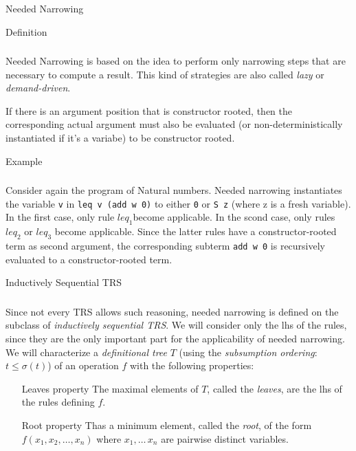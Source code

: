 \documentclass{beamer}
\begin{document}
\begin{section}{Needed Narrowing}
  \begin{subsection}{Definition}
    \begin{frame}
\frametitle{\subsecname}
      Needed Narrowing is based on the idea to perform only narrowing steps that are necessary to compute a result. This kind of strategies are also called \textit{lazy} or \textit{demand-driven}.

      If there is an argument position that is constructor rooted, then the corresponding actual argument must also be evaluated (or non-deterministically instantiated if it's a variabe) to be constructor rooted.
    \end{frame}
  \end{subsection}
\begin{subsection}{Example}

\begin{frame}[fragile]
\frametitle{\subsecname}
Consider again the program of Natural numbers. Needed narrowing instantiates the variable \verb|v| in \verb|leq v (add w 0)| to either \verb|0| or \verb|S z| (where z is a fresh variable). In the first case, only rule $leq_1$become applicable. In the scond case, only rules $leq_2$ or $leq_3$ become applicable. Since the latter rules have a constructor-rooted term as second argument, the corresponding subterm \verb|add w 0| is recursively evaluated to a constructor-rooted term.  
  
\end{frame}
\end{subsection}
\begin{subsection}{Inductively Sequential TRS}
  \begin{frame}[allowpagebreaks]
\frametitle{\subsecname}
Since not every TRS allows such reasoning, needed narrowing is defined on the subclass of \textit{inductively sequential TRS}. We will consider only the lhs of the rules, since they are the  only important part for the applicability of needed narrowing. We will characterize a \textit{definitional tree} $T$ (using the \textit{subsumption ordering}: $t \leq \sigma (t)$) of an operation $f$ with the following properties:
\begin{itemize}
  \setlength{\itemindent}{2cm}
 \item[Leaves property] The maximal elements of $T$, called the \textit{leaves}, are the lhs of the rules defining $f$.
 \item[Root property]Thas a minimum element, called the \textit{root}, of the form $f(x_1,x_2,\ldots,x_n)$ where $x_1,\ldots\,x_n$ are pairwise distinct variables.
\end{itemize}
\end{frame}


\end{subsection}
\end{section}
\end{document}
